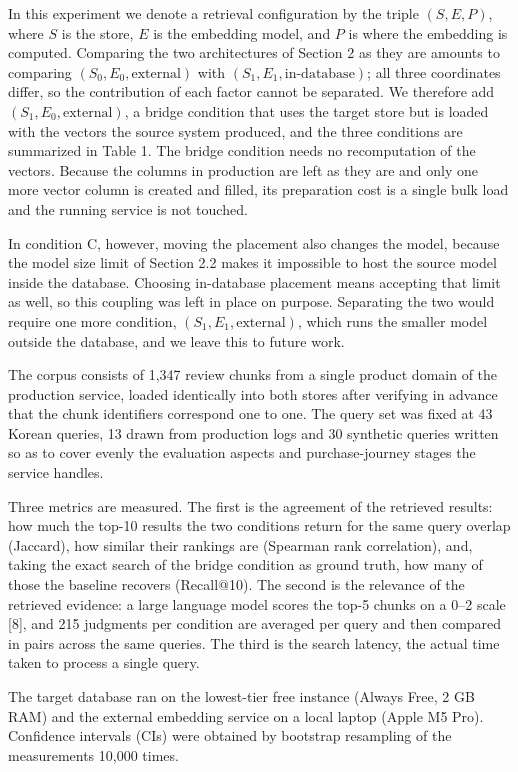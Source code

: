 \documentclass[10pt,a4paper,twocolumn]{article}
\begin{document}
In this experiment we denote a retrieval configuration by the triple $(S, E, P)$, where $S$ is the store, $E$ is the embedding model, and $P$ is where the embedding is computed. Comparing the two architectures of Section 2 as they are amounts to comparing $(S_0, E_0, \text{external})$ with $(S_1, E_1, \text{in-database})$; all three coordinates differ, so the contribution of each factor cannot be separated. We therefore add $(S_1, E_0, \text{external})$, a bridge condition that uses the target store but is loaded with the vectors the source system produced, and the three conditions are summarized in Table 1. The bridge condition needs no recomputation of the vectors. Because the columns in production are left as they are and only one more vector column is created and filled, its preparation cost is a single bulk load and the running service is not touched.

In condition C, however, moving the placement also changes the model, because the model size limit of Section 2.2 makes it impossible to host the source model inside the database. Choosing in-database placement means accepting that limit as well, so this coupling was left in place on purpose. Separating the two would require one more condition, $(S_1, E_1, \text{external})$, which runs the smaller model outside the database, and we leave this to future work.

The corpus consists of 1,347 review chunks from a single product domain of the production service, loaded identically into both stores after verifying in advance that the chunk identifiers correspond one to one. The query set was fixed at 43 Korean queries, 13 drawn from production logs and 30 synthetic queries written so as to cover evenly the evaluation aspects and purchase-journey stages the service handles.

Three metrics are measured. The first is the agreement of the retrieved results: how much the top-10 results the two conditions return for the same query overlap (Jaccard), how similar their rankings are (Spearman rank correlation), and, taking the exact search of the bridge condition as ground truth, how many of those the baseline recovers (Recall@10). The second is the relevance of the retrieved evidence: a large language model scores the top-5 chunks on a 0--2 scale [8], and 215 judgments per condition are averaged per query and then compared in pairs across the same queries. The third is the search latency, the actual time taken to process a single query.

The target database ran on the lowest-tier free instance (Always Free, 2 GB RAM) and the external embedding service on a local laptop (Apple M5 Pro). Confidence intervals (CIs) were obtained by bootstrap resampling of the measurements 10,000 times.
\end{document}
